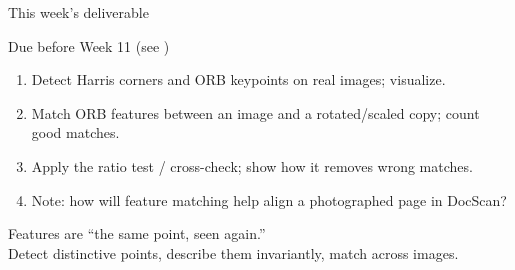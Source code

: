 \documentclass[10pt,aspectratio=169]{beamer}
\begin{document}
\begin{frame}{This week's deliverable}
  \begin{alertblock}{Due before Week 11 (see )}
    \begin{enumerate}
      \item Detect Harris corners and ORB keypoints on real images; visualize.
      \item Match ORB features between an image and a rotated/scaled copy; count good matches.
      \item Apply the ratio test / cross-check; show how it removes wrong matches.
      \item Note: how will feature matching help align a photographed page in DocScan?
    \end{enumerate}
  \end{alertblock}
\end{frame}

\begin{frame}[standout]
  Features are ``the same point, seen again.''\\[4pt]
  \normalsize Detect distinctive points, describe them invariantly, match across images.
\end{frame}
\end{document}

